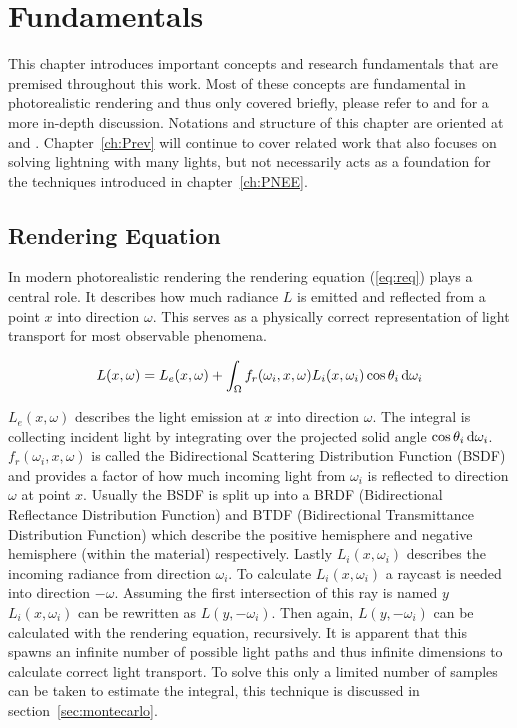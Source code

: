\chapter{Fundamentals}
\label{ch:Fundamentals}
This chapter introduces important concepts and research fundamentals that are premised throughout this work. Most of these concepts are fundamental in photorealistic rendering and thus only covered briefly, please refer to \textcite{veach1997robust} and \textcite{DBLP:conf/siggraph/Kajiya86} for a more in-depth discussion. Notations and structure of this chapter are oriented at \textcite{lecture} and \textcite{pbrt}. Chapter~\ref{ch:Prev} will continue to cover related work that also focuses on solving lightning with many lights, but not necessarily acts as a foundation for the techniques introduced in chapter~\ref{ch:PNEE}.


\section{Rendering Equation}

In modern photorealistic rendering the rendering equation (\ref{eq:req}) plays a central role. It describes how much radiance $L$ is emitted and reflected from a point $x$ into direction $\omega$. This serves as a physically correct representation of light transport for most observable phenomena.

\begin{align}
\label{eq:req}
L(x, \omega) =  L_e(x, \omega) + \int_{\Omega}f_r(\omega_i, x, \omega) L_i(x, \omega_i)\cos\theta_i \mathop{}\!\mathrm{d}\omega_i 
\end{align}

$L_e(x, \omega)$ describes the light emission at $x$ into direction $\omega$. The integral is collecting incident light by integrating over the projected solid angle $\cos\theta_i\mathop{}\!\mathrm{d}\omega_i$. $f_r(\omega_i, x, \omega)$ is called the Bidirectional Scattering Distribution Function (BSDF) and provides a factor of how much incoming light from $\omega_i$ is reflected to direction $\omega$ at point $x$. Usually the BSDF is split up into a BRDF (Bidirectional Reflectance Distribution Function) and BTDF (Bidirectional Transmittance Distribution Function) which describe the positive hemisphere and negative hemisphere (within the material) respectively. Lastly $L_i(x, \omega_i)$ describes the incoming radiance from direction $\omega_i$. To calculate $L_i(x, \omega_i)$ a raycast is needed into direction $-\omega$. Assuming the first intersection of this ray is named $y$ $L_i(x, \omega_i)$ can be rewritten as $L(y, -\omega_i)$. Then again, $L(y, -\omega_i)$ can be calculated with the rendering equation, recursively. It is apparent that this spawns an infinite number of possible light paths and thus infinite dimensions to calculate correct light transport. To solve this only a limited number of samples can be taken to estimate the integral, this technique is discussed in section~\ref{sec:montecarlo}.

